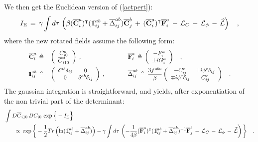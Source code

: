 \documentclass[a4paper,11pt]{article}
\def\Id{{\rm 1\kern-.28em I}}
\begin{document}
We then get the Euclidean version of (\ref{actpert}):
\[
I_{\text{E}}\,=\,\gamma \int d\tau \,\left( \beta (\overline{\mathbf{C}}
_{i}^{a})^{\intercal }(\Id_{ij}^{ab}+\overline{\Delta }_{ij}^{ab})\overline{
\mathbf{C}}_{j}^{b}\,+\,(\overline{\mathbf{C}}_{i}^{a})^{\intercal }\overline{\mathbf{
F}}_{i}^{a}\,-\,\mathcal{L}_{C}\,-\,\mathcal{L}_{\phi }\,-\,\widehat{\mathcal{L}}\right) \quad ,
\]
where the new rotated fields assume the following form:
\begin{align*}
\qquad\qquad\overline{\mathbf{C}}_{i}^{a}\,& \triangleq &\,\left( 
\begin{array}{c}
C_{i0}^{a} \\ 
\overline{C}_{i10}^{a}
\end{array}
\right) 
\;,\qquad\qquad \qquad & \qquad
\overline{\mathbf{F}}_{i}^{a}\,\triangleq \,\left( 
\begin{array}{c}
-F_{i}^{a} \\ 
\pm iG_{i}^{a}
\end{array}
\right) \quad , 
\qquad\qquad\\
\qquad\qquad\Id_{ij}^{ab}\,&\triangleq &\,\left( 
\begin{array}{cc}
\delta ^{ab}\delta _{ij} & 0 \\ 
0 & \delta ^{ab}\delta _{ij}
\end{array}
\right) \;, \qquad& \qquad
\overline{\Delta }_{ij}^{ab}\, \triangleq \,\displaystyle{\frac{3f^{abc}}{\beta }}\left( 
\begin{array}{cc}
-C_{ij}^{c} & \pm i\phi ^{c}\delta _{ij} \\ 
\mp i\phi ^{c}\delta _{ij} & C_{ij}^{c}
\end{array}
\right) \quad .\qquad\qquad
\end{align*}
The gaussian integration is straightforward, and yields, after exponentiation of the
non trivial part of the determinant:
\begin{align*}
\int D\overline{C}_{i10}\,DC_{i0}\,\exp\Big\{-I_{\text{E}}\Big\}
\qquad\qquad\qquad\qquad\qquad\qquad\qquad\qquad\qquad\qquad\qquad
\qquad\qquad\qquad\qquad\qquad&\\
\qquad\propto\,
\exp\bigg\{-\frac{1}{2}Tr\left( \ln (\Id
_{ij}^{ab}+\overline{\Delta }_{ij}^{ab})\right) -\gamma \int d\tau \,\left( -
\frac{1}{4\beta }(\overline{\mathbf{F}}_{i}^{a})^{\intercal }(\Id_{ij}^{ab}+
\overline{\Delta }_{ij}^{ab})^{-1}\overline{\mathbf{F}}_{j}^{b}\,-\,\mathcal{
L}_{C}\,-\,\mathcal{L}_{\phi }\,-\,\widehat{\mathcal{L}}\right) \bigg\}\quad .
\end{align*}
\end{document}
